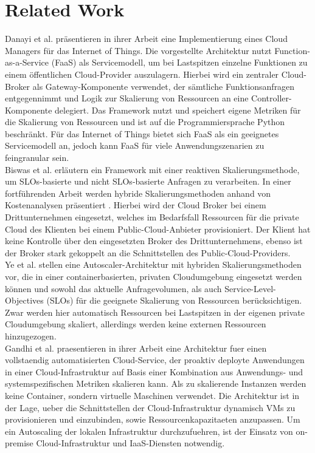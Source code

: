 \documentclass[runningheads]{llncs}
\begin{document}
	
\section{Related Work} \label{work}
	
Danayi et al. \cite{danayi_opencot_2019} präsentieren in ihrer Arbeit eine Implementierung eines Cloud Managers für das Internet of Things. Die vorgestellte Architektur nutzt Function-as-a-Service (FaaS) als Servicemodell, um bei Lastspitzen einzelne Funktionen zu einem öffentlichen Cloud-Provider auszulagern. Hierbei wird ein zentraler Cloud-Broker als Gateway-Komponente verwendet, der sämtliche Funktionsanfragen entgegennimmt und Logik zur Skalierung von Ressourcen an eine Controller-Komponente delegiert. Das Framework nutzt und speichert eigene Metriken für die Skalierung von Ressourcen und ist auf die Programmiersprache Python beschränkt. Für das Internet of Things bietet sich FaaS als ein geeignetes Servicemodell an, jedoch kann FaaS für viele Anwendungszenarien zu feingranular sein. \\
	
Biswas et al. \cite{biswas_auto-scaling_2015} erläutern ein Framework mit einer reaktiven Skalierungsmethode, um SLOs-basierte und nicht SLOs-basierte Anfragen zu verarbeiten. In einer fortführenden Arbeit werden hybride Skalierungsmethoden anhand von Kostenanalysen präsentiert \cite{biswas_hybrid_2017}. Hierbei wird der Cloud Broker bei einem Drittunternehmen eingesetzt, welches im Bedarfsfall Ressourcen für die private Cloud des Klienten bei einem Public-Cloud-Anbieter provisioniert. Der Klient hat keine Kontrolle über den eingesetzten Broker des Drittunternehmens, ebenso ist der Broker stark gekoppelt an die Schnittstellen des Public-Cloud-Providers. \\
	
Ye et al. \cite{ye_auto-scaling_2017} stellen eine Autoscaler-Architektur mit hybriden Skalierungsmethoden vor, die in einer containerbasierten, privaten Cloudumgebung eingesetzt werden können und sowohl das aktuelle Anfragevolumen, als auch Service-Level-Objectives (SLOs) für die geeignete Skalierung von Ressourcen berücksichtigen. Zwar werden hier automatisch Ressourcen bei Lastspitzen in der eigenen private Cloudumgebung skaliert, allerdings werden  keine externen Ressourcen hinzugezogen. \\

Gandhi et al. \cite{gandhi_adaptive_nodate} praesentieren in ihrer Arbeit eine Architektur fuer einen vollstaendig automatisierten Cloud-Service, der proaktiv deployte Anwendungen in einer Cloud-Infrastruktur auf Basis einer Kombination aus Anwendungs- und systemspezifischen Metriken skalieren kann. Als zu skalierende Instanzen werden keine Container, sondern virtuelle Maschinen verwendet. Die Architektur ist in der Lage, ueber die Schnittstellen der Cloud-Infrastruktur dynamisch VMs zu provisionieren und einzubinden, sowie Ressourcenkapazitaeten anzupassen. Um ein Autoscaling der lokalen Infrastruktur durchzufuehren, ist der Einsatz von on-premise Cloud-Infrastruktur und IaaS-Diensten notwendig. \\
	
\end{document}
